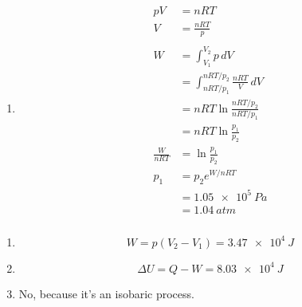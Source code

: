 \documentclass{article}
\begin{document}
\begin{enumerate}
  \item

        \begin{align*}
          p V             & = n R T                                                  \\
          V               & = \frac{n R T}{p}                                        \\ \\
          W               & = \int_{V_1}^{V_2} p \,d V                               \\
                          & = \int_{n R T / p_1}^{n R T / p_2} \frac{n R T}{V} \,d V \\
                          & = n R T \ln \frac{n R T / p_2}{n R T / p_1}              \\
                          & = n R T \ln \frac{p_1}{p_2}                              \\
          \frac{W}{n R T} & = \ln \frac{p_1}{p_2}                                    \\
          p_1             & = p_2 e^{W / n R T}                                      \\
                          & = \qty{1.05e5}{Pa}                                       \\
                          & = \qty{1.04}{atm}
        \end{align*}
\end{enumerate}

\setcounter{subsubsection}{8}
\subsubsection{}

\begin{enumerate}
  \item \[W = p (V_2 - V_1) = \qty{3.47e4}{J}\]

  \item \[\Delta U = Q - W = \qty{8.03e4}{J}\]

  \item No, because it's an isobaric process.
\end{enumerate}

\setcounter{subsubsection}{10}
\subsubsection{}
\end{document}
